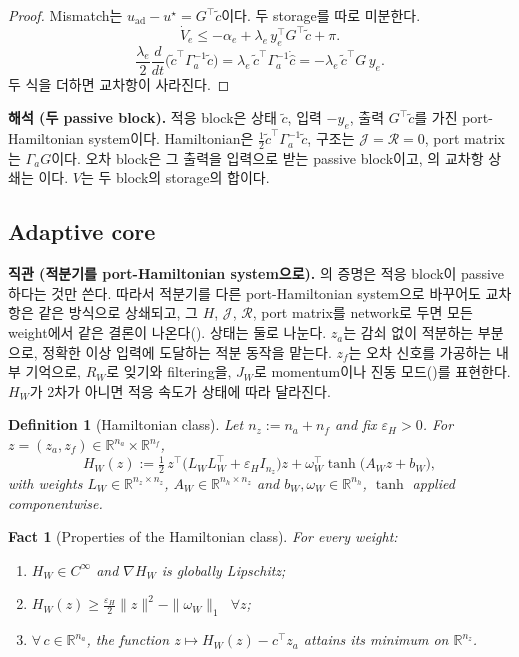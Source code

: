 \documentclass[11pt]{article}\usepackage[margin=1in]{geometry}\usepackage{amsmath,amssymb,amsthm,mathtools}\usepackage{graphicx}\graphicspath{{figures/}{../figures/}{figs/}{./}}\usepackage{enumitem}\usepackage{hyperref}\usepackage{cleveref}\usepackage{tikz}\usetikzlibrary{arrows.meta,positioning,calc,shapes.geometric}\usepackage{float}\usepackage{rotating}\usepackage[most]{tcolorbox}\usepackage{kotex}\usepackage{booktabs}\emergencystretch=1.6em\tolerance=2000 \crefname{assumption}{Assumption}{Assumptions}\Crefname{assumption}{Assumption}{Assumptions}\crefname{definition}{Definition}{Definitions}\Crefname{definition}{Definition}{Definitions}\crefname{proposition}{Proposition}{Propositions}\Crefname{proposition}{Proposition}{Propositions}\crefname{fact}{Fact}{Facts}\Crefname{fact}{Fact}{Facts} \newtheorem{assumption}{Assumption}\newtheorem{definition}{Definition}\newtheorem{lemma}{Lemma}\newtheorem{proposition}{Proposition}\newtheorem{theorem}{Theorem}\newtheorem{corollary}{Corollary}\newtheorem{fact}{Fact}\theoremstyle{remark}\newtheorem{remark}{Remark} \newcommand{\R}{\mathbb{R}}\newcommand{\xb}{\bar x}\newcommand{\Ab}{\bar A}\newcommand{\By}{\bar B_y}\newcommand{\U}{\mathcal U}\newcommand{\Z}{\mathcal Z}
\begin{document}
\begin{proof}
Mismatch는 $u_{\mathrm{ad}}-u^\star=G^\top\tilde c$이다. 두 storage를 따로 미분한다.
\[
\dot V_e\le-\alpha_e+\lambda_e\,y_e^\top G^\top\tilde c+\pi .
\]
\[
\frac{\lambda_e}{2}\frac{d}{dt}\big(\tilde c^\top\Gamma_a^{-1}\tilde c\big)=\lambda_e\,\tilde c^\top\Gamma_a^{-1}\dot{\hat c}=-\lambda_e\,\tilde c^\top G\,y_e .
\]
두 식을 더하면 교차항이 사라진다.
\end{proof}

\textbf{해석 (두 passive block).} 적응 block은 상태 $\tilde c$, 입력 $-y_e$, 출력 $G^\top\tilde c$를 가진 port-Hamiltonian system이다. Hamiltonian은 $\tfrac12\tilde c^\top\Gamma_a^{-1}\tilde c$, 구조는 $\mathcal J=\mathcal R=0$, port matrix는 $\Gamma_aG$이다. 오차 block은 그 출력을 입력으로 받는 passive block이고, 의 교차항 상쇄는 이다. $V$는 두 block의 storage의 합이다.

\subsection{Adaptive core}

\textbf{직관 (적분기를 port-Hamiltonian system으로).} 의 증명은 적응 block이 passive하다는 것만 쓴다. 따라서 적분기를 다른 port-Hamiltonian system으로 바꾸어도 교차항은 같은 방식으로 상쇄되고, 그 $H$, $\mathcal J$, $\mathcal R$, port matrix를 network로 두면 모든 weight에서 같은 결론이 나온다(). 상태는 둘로 나눈다. $z_a$는 감쇠 없이 적분하는 부분으로, 정확한 이상 입력에 도달하는 적분 동작을 맡는다. $z_f$는 오차 신호를 가공하는 내부 기억으로, $R_W$로 잊기와 filtering을, $J_W$로 momentum이나 진동 모드()를 표현한다. $H_W$가 2차가 아니면 적응 속도가 상태에 따라 달라진다.

\begin{definition}[Hamiltonian class]
\label{def:hclass}
Let $n_z:=n_a+n_f$ and fix $\varepsilon_H>0$. For $z=(z_a,z_f)\in\R^{n_a}\times\R^{n_f}$,
\[
H_W(z):=\tfrac12\,z^\top\big(L_WL_W^\top+\varepsilon_HI_{n_z}\big)z+\omega_W^\top\tanh\big(A_Wz+b_W\big),
\]
with weights $L_W\in\R^{n_z\times n_z}$, $A_W\in\R^{n_h\times n_z}$ and $b_W,\omega_W\in\R^{n_h}$, $\tanh$ applied componentwise.
\end{definition}

\begin{fact}[Properties of the Hamiltonian class]
\label{fact:hclass}
For every weight:
\begin{enumerate}[label=(\alph*)]
\item $H_W\in C^\infty$ and $\nabla H_W$ is globally Lipschitz;
\item $H_W(z)\ge\tfrac{\varepsilon_H}{2}\|z\|^2-\|\omega_W\|_1$ $\ \forall z$;
\item $\forall\,c\in\R^{n_a}$, the function $z\mapsto H_W(z)-c^\top z_a$ attains its minimum on $\R^{n_z}$.
\end{enumerate}
\end{fact}
\end{document}
